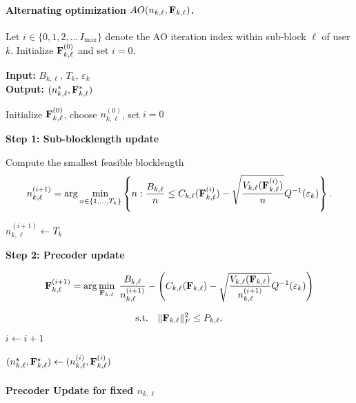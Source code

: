 \documentclass[a4paper, 12pt, onecolumn, journal, twoside, draftclsnofoot]{IEEEtran}
\begin{document}
\paragraph*{Alternating optimization $AO (n_{k,\ell},{\bf F}_{k, \ell})$.}
Let $i\in\{0,1,2,\dots\, I_{\max}\}$ denote the AO iteration index within sub-block $\ell$ of user $k$.
Initialize ${\bf F}_{k, \ell}^{(0)}$ and set $i=0$.
\begin{algorithm}[H]
\caption{Alternating Optimization for $AO(B_{k, \ell}, T_k, \epsilon_k)$}
\textbf{Input:} $B_{k,\ell},\,T_k,\,\varepsilon_k$ \\
\textbf{Output:} $(n^*_{k,\ell},{\bf F}^*_{k,\ell})$
\begin{algorithmic}[1]

\State Initialize ${\bf F}_{k, \ell}^{(0)}$, choose $n_{k,\ell}^{(0)}$, set $i=0$


\State \textbf{Step 1: Sub-blocklength update}

\State Compute the smallest feasible blocklength
\begin{equation*}
n_{k,\ell}^{(i+1)}
=
\arg \min_{n\in\{1,\dots,T_k\}}
\left\{
n :
\frac{B_{k,\ell}}{n}
\le
C_{k,\ell}({\bf F}_{k, \ell}^{(i)})
-
\sqrt{\frac{V_{k,\ell}({\bf F}_{k, \ell}^{(i)})}{n}}
Q^{-1}(\varepsilon_k)
\right\}.
\end{equation*}

\State $n_{k,\ell}^{(i+1)} \gets T_k$
\EndIf



\State \textbf{Step 2: Precoder update}

\begin{equation*}
{\bf F}_{k, \ell}^{(i+1)} =
\arg\min_{{\bf F}_{k, \ell}}
\;
\frac{B_{k,\ell}}{n_{k,\ell}^{(i+1)}} -
\left(
C_{k,\ell}({\bf F}_{k, \ell})
-
\sqrt{\frac{V_{k,\ell}({\bf F}_{k, \ell})}{n_{k,\ell}^{(i+1)}}}
Q^{-1}(\varepsilon_k)
\right)
\end{equation*}

\begin{equation*}
\text{s.t.}\quad
\|{\bf F}_{k, \ell}\|_F^2 \le P_{k,\ell}.
\end{equation*}
\State $i \gets i+1$

\EndWhile

\State $(n^\star_{k,\ell},{\bf F}^\star_{k,\ell}) \gets (n_{k,\ell}^{(i)},{\bf F}_{k, \ell}^{(i)})$

\end{algorithmic}
\end{algorithm}
\paragraph*{Precoder Update for fixed $n_{k,\ell}$ }
\end{document}
